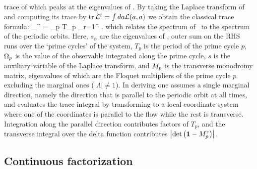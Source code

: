	\label{eq-ResolventA}
\eeq
trace of which peaks at the eigenvalues of \Aop. By taking the
Laplace transform of  and computing its trace
by $\mbox{\rm tr}\, {\cal L}^{t} = \int da {\cal L} (a,a)$ we obtain the
classical trace formula:
\beq
\sum_{}^{\infty}  = \sum_p T_p
\sum_{r=1}^{\infty}  .
which relates the spectrum of \Aop\ to the spectrum of the periodic
orbits. Here, $s_{\alpha}$ are the eigenvalues of \Aop ,
outer sum on the RHS runs over the `prime cycles' of the system,
$T_p$ is the period of the prime cycle $p$, $\Omega_p$ is the value of
the observable integrated along the prime cycle, $s$ is the auxiliary
variable of the Laplace transform, and $M_p$ is the transverse
monodromy matrix, eigenvalues of which are the Floquet multipliers of the prime
cycle $p$ excluding the marginal ones ($|\Lambda| \neq 1$). In deriving
 one assumes a single marginal direction, namely
the direction that is parallel to the periodic orbit at all times, and evaluates
the trace integral by transforming to a local coordinate system where one of the
coordinates is parallel to the flow while the rest is transverse. Integration along
the parallel direction contributes factors of $T_p$, and the transverse integral
over the delta function contributes $\left|\mbox{\rm det}\,\!\left({\bf 1}-M_p^{r}\right)\right|$. 

\subsection{Continuous factorization}
\label{s-ContFac}

